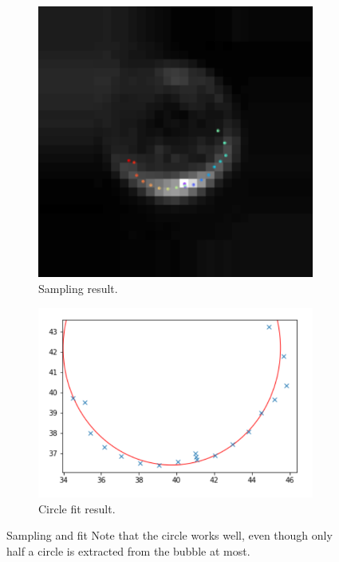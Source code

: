 				\begin{figure}
				
					\begin{subfigure}[t]{.50\textwidth}
						\centering
						\includegraphics[scale=.8]{images/sampling_result.png}
						\caption{Sampling result. }
					\end{subfigure}					
					\begin{subfigure}[t]{.55\textwidth}
						\centering
						\includegraphics[scale=.7]{graphs/circle_fit.png}
						\caption{Circle fit result.}
					\end{subfigure}
					
					
					\caption{Sampling and fit Note that the circle works well, even though only half a circle is extracted from the bubble at most. }
					\label{fig:fit_circle_fit_result}
				\end{figure}



